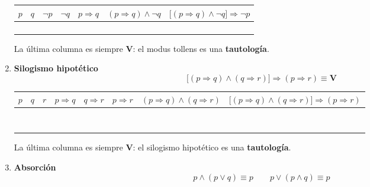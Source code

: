 \begin{enumerate}[label=\alph*)]
\begin{center}
	\renewcommand{\arraystretch}{1.4}
	\begin{tabular}{|c|c|c|c|c|c||c|}
		\hline
		$p$ & $q$ & $\lnot p$ & $\lnot q$ & $p \Rightarrow q$ & $(p \Rightarrow q) \land \lnot q$ & $\bigl[(p \Rightarrow q) \land \lnot q\bigr] \Rightarrow \lnot p$ \\
		\hline
		\V & \V & \F & \F & \V & \F & \V \\
		\hline
		\V & \F & \F & \V & \F & \F & \V \\
		\hline
		\F & \V & \V & \F & \V & \F & \V \\
		\hline
		\F & \F & \V & \V & \V & \V & \V \\
		\hline
	\end{tabular}
\end{center}
\noindent La última columna es siempre \textbf{V}: el modus tollens es una \textbf{tautología}.

\item \textbf{Silogismo hipotético}
\[\bigl[(p \Rightarrow q) \land (q \Rightarrow r)\bigr] \Rightarrow (p \Rightarrow r) \equiv \mathbf{V}\]

\begin{center}
	\renewcommand{\arraystretch}{1.4}
	\begin{tabular}{|c|c|c|c|c|c|c||c|}
		\hline
		$p$ & $q$ & $r$ & $p \Rightarrow q$ & $q \Rightarrow r$ & $p \Rightarrow r$ & $(p \Rightarrow q) \land (q \Rightarrow r)$ & $\bigl[(p \Rightarrow q) \land (q \Rightarrow r)\bigr] \Rightarrow (p \Rightarrow r)$ \\
		\hline
		\V & \V & \V & \V & \V & \V & \V & \V \\
		\hline
		\V & \V & \F & \V & \F & \F & \F & \V \\
		\hline
		\V & \F & \V & \F & \V & \V & \F & \V \\
		\hline
		\V & \F & \F & \F & \V & \F & \F & \V \\
		\hline
		\F & \V & \V & \V & \V & \V & \V & \V \\
		\hline
		\F & \V & \F & \V & \F & \V & \F & \V \\
		\hline
		\F & \F & \V & \V & \V & \V & \V & \V \\
		\hline
		\F & \F & \F & \V & \V & \V & \V & \V \\
		\hline
	\end{tabular}
\end{center}
\noindent La última columna es siempre \textbf{V}: el silogismo hipotético es una \textbf{tautología}.
\newpage
\item \textbf{Absorción}
\[p \land (p \vee q) \equiv p \qquad p \vee (p \land q) \equiv p\]


\end{enumerate}
